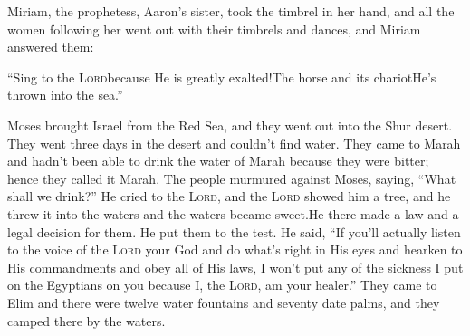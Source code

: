 \begin{inparaenum}
   Miriam, the prophetess, Aaron's sister, took the timbrel in her hand, and all the women following her went out with their timbrels and dances,%
   and Miriam answered them:\smallskip%
  
  \pb ``Sing to the \textsc{Lord}\pa because He is greatly exalted!\pa The horse and its chariot\pa He's thrown into the sea.''%
  
   Moses brought Israel from the Red Sea, and they went out into the Shur desert. They went three days in the desert and couldn't find water.%
   They came to Marah and hadn't been able to drink the water of Marah because they were bitter; hence they called it Marah.%
   The people murmured against Moses, saying, ``What shall we drink?''%
   He cried to the \textsc{Lord}, and the \textsc{Lord} showed him a tree, and he threw it into the waters and the waters became sweet.\hspace*{4em}He there made a law and a legal decision for them. He put them to the test.%
   He said, ``If you'll actually listen to the voice of the \textsc{Lord} your God and do what's right in His eyes and hearken to His commandments and obey all of His laws, I won't put any of the sickness I put on the Egyptians on you because I, the \textsc{Lord}, am your healer.''%
   They came to Elim and there were twelve water fountains and seventy date palms, and they camped there by the waters.%
\end{inparaenum}
